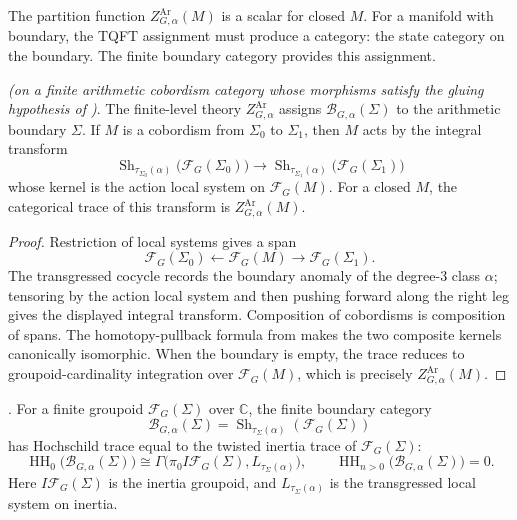 The partition function \(Z^{\mathrm{Ar}}_{G,\alpha}(M)\) is a scalar for
closed \(M\). For a manifold with boundary, the TQFT assignment must
produce a category: the state category on the boundary. The finite
boundary category provides this assignment.

\begin{theorem}
\label{v4-arith:3d-acs:thm:finite-bulk-boundary}
\ClaimStatusConditional \emph{(on a finite arithmetic cobordism
category whose morphisms satisfy the gluing hypothesis of
)}. The finite-level theory
\(Z^{\mathrm{Ar}}_{G,\alpha}\) assigns
\(\mathcal B_{G,\alpha}(\Sigma)\) to the arithmetic boundary
\(\Sigma\). If \(M\) is a cobordism from \(\Sigma_{0}\) to
\(\Sigma_{1}\), then \(M\) acts by the integral transform
\[
\operatorname{Sh}_{\tau_{\Sigma_{0}}(\alpha)}
\bigl(\mathcal F_{G}(\Sigma_{0})\bigr)
\longrightarrow
\operatorname{Sh}_{\tau_{\Sigma_{1}}(\alpha)}
\bigl(\mathcal F_{G}(\Sigma_{1})\bigr)
\]
whose kernel is the action local system on \(\mathcal F_{G}(M)\).
For a closed \(M\), the categorical trace of this transform is
\(Z^{\mathrm{Ar}}_{G,\alpha}(M)\).
\end{theorem}

\begin{proof}
Restriction of local systems gives a span
\[
\mathcal F_{G}(\Sigma_{0})\leftarrow \mathcal F_{G}(M)
\rightarrow \mathcal F_{G}(\Sigma_{1}).
\]
The transgressed cocycle records the boundary anomaly of the
degree-3 class \(\alpha\); tensoring by the action local system and
then pushing forward along the right leg gives the displayed integral
transform. Composition of cobordisms is composition of spans. The
homotopy-pullback formula from
 makes the two composite
kernels canonically isomorphic. When the boundary is empty, the
trace reduces to groupoid-cardinality integration over
\(\mathcal F_{G}(M)\), which is precisely
\(Z^{\mathrm{Ar}}_{G,\alpha}(M)\).
\end{proof}

\begin{proposition}
\label{v4-arith:3d-acs:prop:finite-boundary-HH}
\ClaimStatusProvedHere. For a finite groupoid \(\mathcal F_G(\Sigma)\)
over \(\mathbb C\), the finite boundary category
\[
\mathcal B_{G,\alpha}(\Sigma)=
\operatorname{Sh}_{\tau_\Sigma(\alpha)}(\mathcal F_G(\Sigma))
\]
has Hochschild trace equal to the twisted inertia trace of
\(\mathcal F_G(\Sigma)\):
\[
\operatorname{HH}_{0}\bigl(\mathcal B_{G,\alpha}(\Sigma)\bigr)
\cong
\Gamma\bigl(\pi_0 I\mathcal F_G(\Sigma),
L_{\tau_\Sigma(\alpha)}\bigr),
\qquad
\operatorname{HH}_{n>0}\bigl(\mathcal B_{G,\alpha}(\Sigma)\bigr)=0.
\]
Here \(I\mathcal F_G(\Sigma)\) is the inertia groupoid, and
\(L_{\tau_\Sigma(\alpha)}\) is the transgressed local system on
inertia.
\end{proposition}

